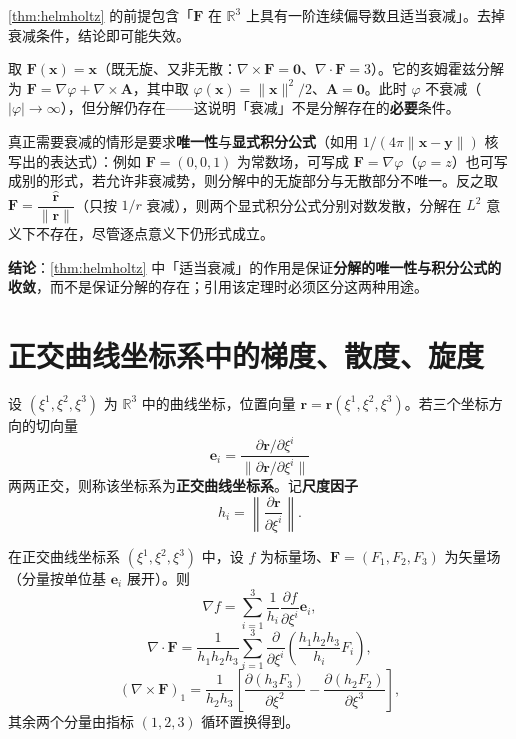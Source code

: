 \begin{example}[反例：衰减条件不可省则亥姆霍兹分解失效]\label{ex:helmholtz_decay_fails}
\cref{thm:helmholtz} 的前提包含「$\mathbf F$ 在 $\mathbb R^3$ 上具有一阶连续偏导数且适当衰减」。去掉衰减条件，结论即可能失效。

取 $\mathbf F(\mathbf x) = \mathbf x$（既无旋、又非无散：$\nabla\times\mathbf F=\mathbf 0$、$\nabla\cdot\mathbf F=3$）。它的亥姆霍兹分解为 $\mathbf F = \nabla\varphi+\nabla\times\mathbf A$，其中取 $\varphi(\mathbf x)=\|\mathbf x\|^2/2$、$\mathbf A=\mathbf 0$。此时 $\varphi$ 不衰减（$|\varphi|\to\infty$），但分解仍存在——这说明「衰减」不是分解存在的\textbf{必要}条件。

真正需要衰减的情形是要求\textbf{唯一性}与\textbf{显式积分公式}（如用 $1/(4\pi\|\mathbf x-\mathbf y\|)$ 核写出的表达式）：例如 $\mathbf F=(0,0,1)$ 为常数场，可写成 $\mathbf F=\nabla\varphi$（$\varphi=z$）也可写成别的形式，若允许非衰减势，则分解中的无旋部分与无散部分不唯一。反之取 $\mathbf F=\dfrac{\hat{\mathbf r}}{\|\mathbf r\|}$（只按 $1/r$ 衰减），则两个显式积分公式分别对数发散，分解在 $L^2$ 意义下不存在，尽管逐点意义下仍形式成立。

\textbf{结论}：\cref{thm:helmholtz} 中「适当衰减」的作用是保证\textbf{分解的唯一性与积分公式的收敛}，而不是保证分解的存在；引用该定理时必须区分这两种用途。
\end{example}

\section{正交曲线坐标系中的梯度、散度、旋度}

\begin{definition}[正交曲线坐标系]\label{def:orthogonal_curvilinear}
设 $(\xi^1,\xi^2,\xi^3)$ 为 $\mathbb R^3$ 中的曲线坐标，位置向量 $\mathbf r = \mathbf r(\xi^1,\xi^2,\xi^3)$。若三个坐标方向的切向量
\[
\mathbf e_i = \frac{\partial\mathbf r/\partial\xi^i}{\|\partial\mathbf r/\partial\xi^i\|}
\]
两两正交，则称该坐标系为\textbf{正交曲线坐标系}。记\textbf{尺度因子}
\[
h_i = \left\|\frac{\partial\mathbf r}{\partial\xi^i}\right\|.
\]
\end{definition}

\begin{proposition}[正交曲线坐标系中的三个算子]\label{prop:curvilinear_operators}
在正交曲线坐标系 $(\xi^1,\xi^2,\xi^3)$ 中，设 $f$ 为标量场、$\mathbf F=(F_1,F_2,F_3)$ 为矢量场（分量按单位基 $\mathbf e_i$ 展开）。则
\[
\nabla f = \sum_{i=1}^3 \frac{1}{h_i}\frac{\partial f}{\partial\xi^i}\mathbf e_i,
\]
\[
\nabla\cdot\mathbf F = \frac{1}{h_1h_2h_3}\sum_{i=1}^3 \frac{\partial}{\partial\xi^i}\left(\frac{h_1h_2h_3}{h_i}F_i\right),
\]
\[
(\nabla\times\mathbf F)_1 = \frac{1}{h_2h_3}\left[\frac{\partial(h_3F_3)}{\partial\xi^2}-\frac{\partial(h_2F_2)}{\partial\xi^3}\right],
\]
其余两个分量由指标 $(1,2,3)$ 循环置换得到。
\end{proposition}


